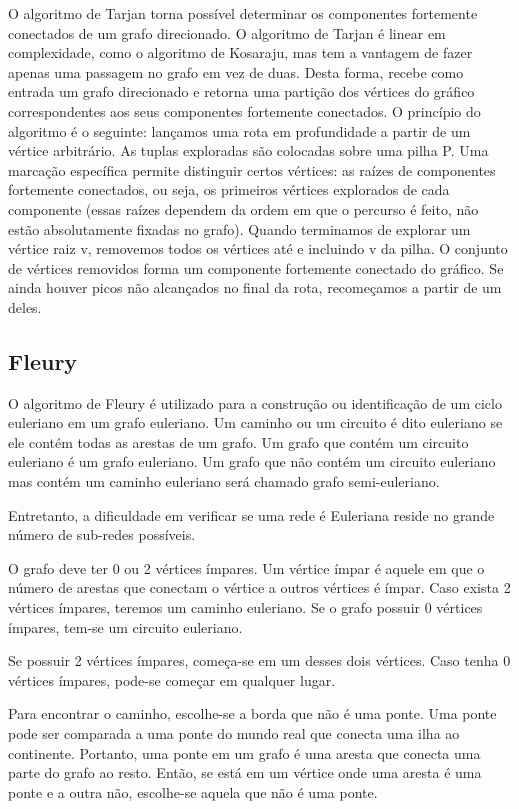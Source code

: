 O algoritmo de Tarjan torna possível determinar os componentes fortemente conectados de um grafo direcionado. O algoritmo de Tarjan é linear em complexidade, como o algoritmo de Kosaraju, mas tem a vantagem de fazer apenas uma passagem no grafo em vez de duas. 
Desta forma, recebe como entrada um grafo direcionado e retorna uma partição dos vértices do gráfico correspondentes aos seus componentes fortemente conectados. 
O princípio do algoritmo é o seguinte: lançamos uma rota em profundidade a partir de um vértice arbitrário. As tuplas exploradas são colocadas sobre uma pilha P. Uma marcação específica permite distinguir certos vértices: as raízes de componentes fortemente conectados, ou seja, os primeiros vértices explorados de cada componente (essas raízes dependem da ordem em que o percurso é feito, não estão absolutamente fixadas no grafo). Quando terminamos de explorar um vértice raiz v, removemos todos os vértices até e incluindo v da pilha. O conjunto de vértices removidos forma um componente fortemente conectado do gráfico. Se ainda houver picos não alcançados no final da rota, recomeçamos a partir de um deles.

\subsection{\esp Fleury}

O algoritmo de Fleury é utilizado para a construção ou identificação de um ciclo euleriano em um grafo euleriano. Um caminho ou um circuito é dito euleriano se ele contém todas as arestas de um grafo. Um grafo que contém um circuito euleriano é um grafo euleriano. Um grafo que não contém um circuito euleriano mas contém um caminho euleriano será chamado grafo semi-euleriano.

Entretanto, a dificuldade em verificar se uma rede é Euleriana reside no grande número de sub-redes possíveis.

O grafo deve ter 0 ou 2 vértices ímpares. Um vértice ímpar é aquele em que o número de arestas que conectam o vértice a outros vértices é ímpar. Caso exista 2 vértices ímpares, teremos um caminho euleriano. Se o grafo possuir 0 vértices ímpares, tem-se um circuito euleriano. 

Se possuir 2 vértices ímpares, começa-se em um desses dois vértices. Caso tenha 0 vértices ímpares, pode-se começar em qualquer lugar.

Para encontrar o caminho, escolhe-se a borda que não é uma ponte. Uma ponte pode ser comparada a uma ponte do mundo real que conecta uma ilha ao continente. Portanto, uma ponte em um grafo é uma aresta que conecta uma parte do grafo ao resto. Então, se está em um vértice onde uma aresta é uma ponte e a outra não, escolhe-se aquela que não é uma ponte.


